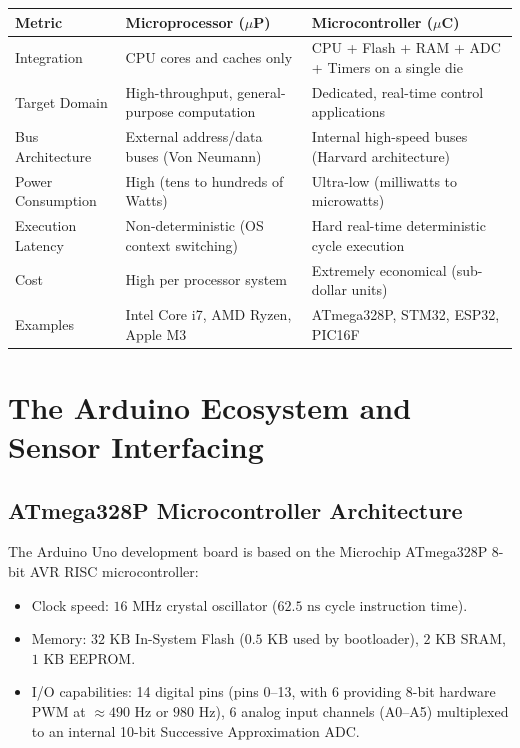 \begin{center}\small
\begin{tabularx}{\linewidth}{l X X}
\toprule
\textbf{Metric} & \textbf{Microprocessor ($\mu$P)} & \textbf{Microcontroller ($\mu$C)} \\
\midrule
Integration & CPU cores and caches only & CPU + Flash + RAM + ADC + Timers on a single die \\
Target Domain & High-throughput, general-purpose computation & Dedicated, real-time control applications \\
Bus Architecture & External address/data buses (Von Neumann) & Internal high-speed buses (Harvard architecture) \\
Power Consumption & High (tens to hundreds of Watts) & Ultra-low (milliwatts to microwatts) \\
Execution Latency & Non-deterministic (OS context switching) & Hard real-time deterministic cycle execution \\
Cost & High per processor system & Extremely economical (sub-dollar units) \\
Examples & Intel Core i7, AMD Ryzen, Apple M3 & ATmega328P, STM32, ESP32, PIC16F \\
\bottomrule
\end{tabularx}
\end{center}\vspace{2mm}

\section{The Arduino Ecosystem and Sensor Interfacing}

\subsection{ATmega328P Microcontroller Architecture}
The Arduino Uno development board is based on the Microchip ATmega328P 8-bit AVR RISC microcontroller:
\begin{itemize}[leftmargin=1.5em]
    \item Clock speed: $16\text{ MHz}$ crystal oscillator ($62.5\text{ ns}$ cycle instruction time).
    \item Memory: $32\text{ KB}$ In-System Flash ($0.5\text{ KB}$ used by bootloader), $2\text{ KB}$ SRAM, $1\text{ KB}$ EEPROM.
    \item I/O capabilities: 14 digital pins (pins 0--13, with 6 providing 8-bit hardware PWM at $\approx 490\text{ Hz}$ or $980\text{ Hz}$), 6 analog input channels (A0--A5) multiplexed to an internal 10-bit Successive Approximation ADC.
\end{itemize}

